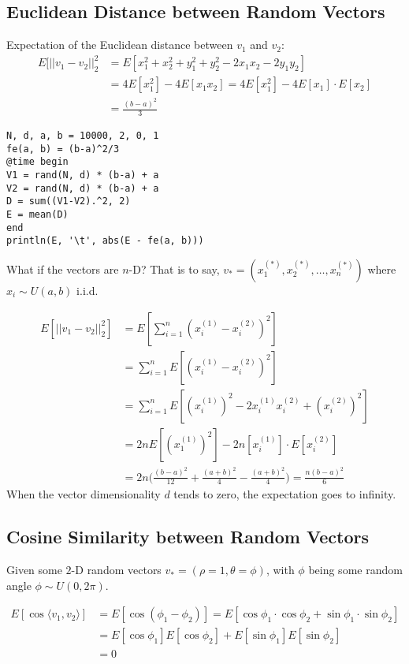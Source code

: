 \subsection{Euclidean Distance between Random Vectors}

Expectation of the Euclidean distance between $v_1$ and $v_2$:
\begin{align}
E[||v_1 - v_2||_2^2 &= E[x_1^2 + x_2^2 + y_1^2 + y_2^2 -2x_1x_2 -2y_1y_2]\\
  &= 4E[x_1^2] -4 E[x_1x_2] = 4E[x_1^2] -4 E[x_1]\cdot E[x_2]\\
  &= \frac{(b-a)^2}{3}
\end{align}
\begin{verbatim}
N, d, a, b = 10000, 2, 0, 1
fe(a, b) = (b-a)^2/3
@time begin
V1 = rand(N, d) * (b-a) + a
V2 = rand(N, d) * (b-a) + a
D = sum((V1-V2).^2, 2)
E = mean(D)
end
println(E, '\t', abs(E - fe(a, b)))
\end{verbatim}

What if the vectors are $n$-D? That is to say,
$v_* = (x_1^{(*)}, x_2^{(*)}, \ldots, x_n^{(*)})$
where $x_i \sim U(a,b)$ i.i.d.

\begin{align}
	E[||v_1 - v_2||_2^2] &= E[\sum_{i=1}^n (x^{(1)}_i - x^{(2)}_i)^2 ]\\
	&= \sum_{i=1}^n E[(x^{(1)}_i - x^{(2)}_i)^2 ]\\
	&= \sum_{i=1}^n E[(x^{(1)}_i)^2 - 2x^{(1)}_i x^{(2)}_i +
		(x^{(2)}_i)^2]\\
	&= 2n E[(x^{(1)}_1)^2] - 2n [x^{(1)}_i]\cdot E[x^{(2)}_i]\\
	&= 2n \big( \frac{(b-a)^2}{12} + \frac{(a+b)^2}{4}
		- \frac{(a+b)^2}{4} \big) = \frac{n(b-a)^2}{6}
\end{align}
When the vector dimensionality $d$ tends to zero, the expectation
goes to infinity.

\subsection{Cosine Similarity between Random Vectors}

Given some $2$-D random vectors $v_*=(\rho=1, \theta=\phi)$, with $\phi$
being some random angle $\phi \sim U(0,2\pi)$.

\begin{align}
E[\cos\langle v_1, v_2\rangle]
  &= E[\cos(\phi_1-\phi_2)] = E[\cos\phi_1 \cdot \cos\phi_2 +
     \sin\phi_1 \cdot \sin\phi_2]\\
  &= E[\cos\phi_1]E[\cos\phi_2] + E[\sin\phi_1]E[\sin\phi_2]\\
  &= 0
\end{align}

